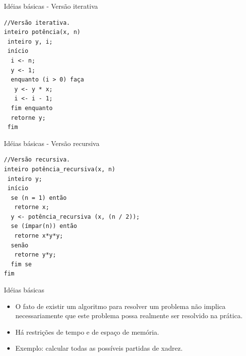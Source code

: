 \documentclass[12pt,table,xcolor={dvipsnames}]{beamer}
\begin{document}
\begin{frame}[fragile]{Idéias básicas - Versão iterativa}
\begin{lstlisting}
//Versão iterativa.
inteiro potência(x, n)
 inteiro y, i;
 início
  i <- n;
  y <- 1;
  enquanto (i > 0) faça
   y <- y * x;
   i <- i - 1;
  fim enquanto
  retorne y;
 fim
\end{lstlisting}
\end{frame}

\begin{frame}[fragile]{Idéias básicas - Versão recursiva}
\begin{lstlisting}
//Versão recursiva.
inteiro potência_recursiva(x, n)
 inteiro y;
 início
  se (n = 1) então
   retorne x;
  y <- potência_recursiva (x, (n / 2));
  se (ímpar(n)) então
   retorne x*y*y;
  senão
   retorne y*y;
  fim se
fim
\end{lstlisting}
\end{frame}

\begin{frame}[fragile]{Idéias básicas}
\begin{itemize}
\item O fato de existir um algoritmo para resolver um problema não implica necessariamente que este problema possa realmente ser resolvido na prática. 
\item Há restrições de tempo e de espaço de memória.
\item Exemplo: calcular todas as possíveis partidas de xadrez.
\end{itemize}
\end{frame}
\end{document}
